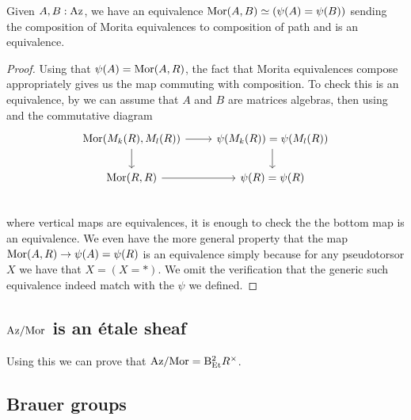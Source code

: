 \begin{lemma}\label{torsor-morita-invariant}
Given $A,B:{\mathrm{Az}}$, we have an equivalence ${\mathrm{Mor}}(A,B) \simeq (\psi(A) = \psi(B))$ sending the composition of Morita equivalences to composition of path and is an equivalence. 
\end{lemma}

\begin{proof}
Using that $\psi(A) = {\mathrm{Mor}}(A,R)$, the fact that Morita equivalences compose appropriately gives us the map commuting with composition. To check this is an equivalence, by  we can assume that $A$ and $B$ are matrices algebras, then using  and the commutative diagram
\[\begin{tikzcd}
\Mor(M_k(R),M_l(R)) \ar[r]\ar[d]& \psi(M_k(R)) = \psi(M_l(R))\ar[d] \\
\Mor(R,R)\ar[r] & \psi(R)=\psi(R)\\
\end{tikzcd}\]
where vertical maps are equivalences, it is enough to check the the bottom map is an equivalence. We even have the more general property that the map ${\mathrm{Mor}}(A,R) \to \psi(A)=\psi(R)$ is an equivalence simply because for any pseudotorsor $X$ we have that $X=(X=*)$. We omit the verification that the generic such equivalence indeed match with the $\psi$ we defined.
\end{proof}


\subsection{${\mathrm{Az}}/{\mathrm{Mor}}$ is an \'etale sheaf}


\begin{remark}
Using this we can prove that ${\mathrm{Az}}/{\mathrm{Mor}} = \mathrm{B}^2_{{\mathrm{Et}}}R^\times$. %
\end{remark}


\subsection{Brauer groups}


